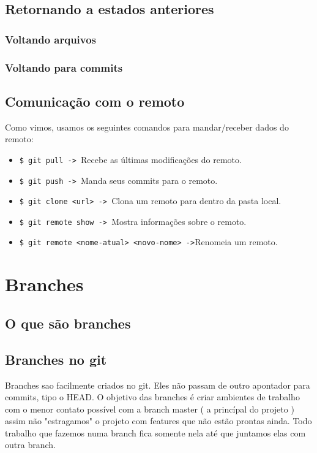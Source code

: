 \documentclass{article}
\begin{document}
\subsection{Retornando a estados anteriores}

\subsubsection{Voltando arquivos}
\subsubsection{Voltando para commits}
\subsection{Comunicação com o remoto}
    Como vimos, usamos os seguintes comandos para mandar/receber dados do remoto:
    \begin{itemize}
        \item \verb#$ git pull -> #Recebe as últimas modificações do remoto.
        \item \verb#$ git push -> #Manda seus commits para o remoto.
        \item \verb#$ git clone <url> -> #Clona um remoto para dentro da pasta local.
        \item \verb#$ git remote show -> #Mostra informações sobre o remoto.
        \item \verb#$ git remote <nome-atual> <novo-nome> ->#Renomeia um remoto.
    \end{itemize}

\section{Branches}

\subsection{O que são branches}

\subsection{Branches no git}
    Branches sao facilmente criados no git. Eles não passam de outro apontador para 
commits, tipo o HEAD. O objetivo das branches é criar ambientes de trabalho com o
menor contato possível com a branch master ( a princípal do projeto ) assim
não "estragamos" o projeto com features que não estão prontas ainda. Todo trabalho
que fazemos numa branch fica somente nela até que juntamos elas com outra branch.
\end{document}
